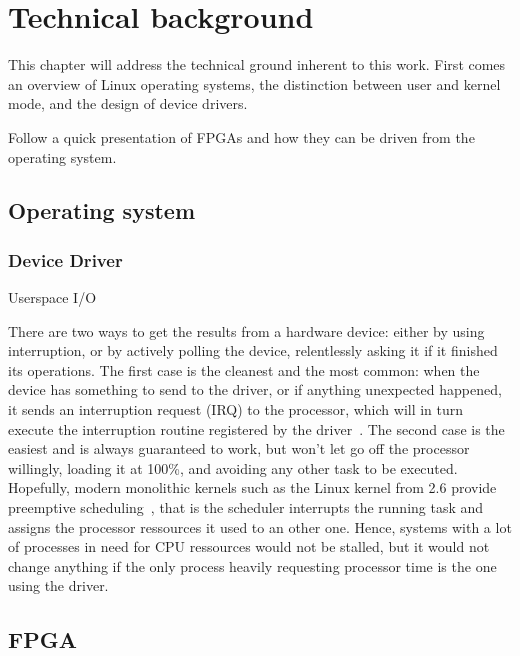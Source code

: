 \chapter{Technical background}\label{chap:theory}

This chapter will address the technical ground inherent to this work.
First comes an overview of Linux operating systems, the distinction between user and kernel mode, and the design of device drivers.

Follow a quick presentation of FPGAs and how they can be driven from the operating system.

\section{Operating system}



\subsection{Device Driver}\label{sec:theory-driver}
Userspace I/O~\cite{koch2011}

There are two ways to get the results from a hardware device: either by using interruption, or by actively polling the device, relentlessly asking it if it finished its operations.
The first case is the cleanest and the most common: when the device has something to send to the driver, or if anything unexpected happened, it sends an interruption request (IRQ) to the processor, which will in turn execute the interruption routine registered by the driver~\citep[chap. 10]{Corbet:2005:LDD:1209083}.
The second case is the easiest and is always guaranteed to work, but won't let go off the processor willingly, loading it at 100\%, and avoiding any other task to be executed.
Hopefully, modern monolithic kernels such as the Linux kernel from 2.6 provide preemptive scheduling~\cite{Santhanam2003}, that is the scheduler interrupts the running task and assigns the processor ressources it used to an other one.
Hence, systems with a lot of processes in need for CPU ressources would not be stalled, but it would not change anything if the only process heavily requesting processor time is the one using the driver.

\section{FPGA}

